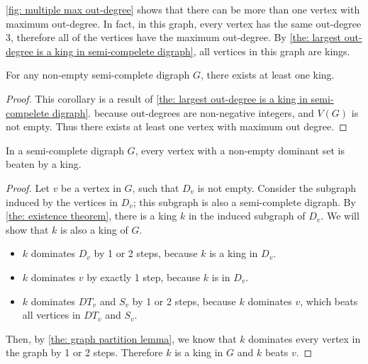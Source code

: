   \cref{fig: multiple max out-degree} shows that
  there can be more than one vertex with maximum out-degree.
  In fact, in this graph,
  every vertex has the same out-degree 3,
  therefore all of the vertices have the maximum out-degree.
  By \cref{the: largest out-degree is a king in semi-compelete digraph},
  all vertices in this graph are kings.

  \begin{corollary}\label{the: existence theorem}
    For any non-empty semi-complete digraph \(G\),
    there exists at least one king.
  \end{corollary}

  \begin{proof}
    This corollary is a result of \cref{the: largest out-degree is a king in semi-compelete digraph}.
    because out-degrees are non-negative integers,
    and \(V(G)\) is not empty.
    Thus there exists at least one vertex with maximum out degree.
  \end{proof}

  \begin{theorem}\label{the: beaten by king theorem}
    In a semi-complete digraph \(G\),
    every vertex with a non-empty dominant set
    is beaten by a king.
  \end{theorem}

  \begin{proof}
    Let \(v\) be a vertex in \(G\), such that \(D_v\) is not empty.
    Consider the subgraph induced by the vertices in \(D_v\);
    this subgraph is also a semi-complete digraph.
    By \cref{the: existence theorem},
    there is a king \(k\) in the induced subgraph of \(D_v\).
    We will show that \(k\) is also a king of \(G\).
    \begin{itemize}
      \item
        \(k\) dominates \(D_v\) by 1 or 2 steps,
        because \(k\) is a king in \(D_v\).
      \item
        \(k\) dominates \(v\) by exactly 1 step,
        because \(k\) is in \(D_v\).
      \item
        \(k\) dominates \(DT_v\) and \(S_v\) by 1 or 2 steps,
        because \(k\) dominates \(v\),
        which beats all vertices in \(DT_v\) and \(S_v\).
    \end{itemize}

    Then, by \cref{the: graph partition lemma},
    we know that \(k\) dominates
    every vertex in the graph by 1 or 2 steps.
    Therefore \(k\) is a king in \(G\) and \(k\) beats \(v\).
  \end{proof}

